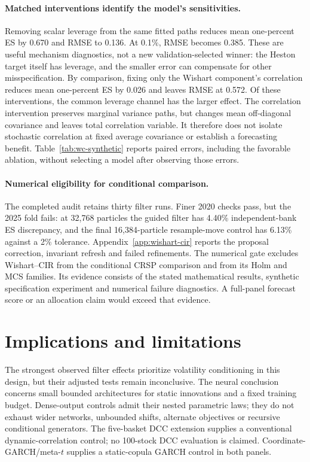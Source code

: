 \documentclass[11pt]{article}
\theoremstyle{definition}\newtheorem{definition}[theorem]{Definition}
\theoremstyle{remark}\newtheorem{remark}[theorem]{Remark}
\begin{document}
\paragraph{Matched interventions identify the model's sensitivities.}
Removing scalar leverage from the same fitted paths reduces mean one-percent ES by 0.670 and RMSE to 0.136. At 0.1\%, RMSE becomes 0.385. These are useful mechanism diagnostics, not a new validation-selected winner: the Heston target itself has leverage, and the smaller error can compensate for other misspecification. By comparison, fixing only the Wishart component's correlation reduces mean one-percent ES by 0.026 and leaves RMSE at 0.572. Of these interventions, the common leverage channel has the larger effect. The correlation intervention preserves marginal variance paths, but changes mean off-diagonal covariance and leaves total correlation variable. It therefore does not isolate stochastic correlation at fixed average covariance or establish a forecasting benefit. Table~\ref{tab:wc-synthetic} reports paired errors, including the favorable ablation, without selecting a model after observing those errors.

\paragraph{Numerical eligibility for conditional comparison.}
The completed audit retains thirty filter runs. Finer 2020 checks pass, but the 2025 fold fails: at 32,768 particles the guided filter has 4.40\% independent-bank ES discrepancy, and the final 16,384-particle resample-move control has 6.13\% against a 2\% tolerance. Appendix~\ref{app:wishart-cir} reports the proposal correction, invariant refresh and failed refinements. The numerical gate excludes Wishart--CIR from the conditional CRSP comparison and from its Holm and MCS families. Its evidence consists of the stated mathematical results, synthetic specification experiment and numerical failure diagnostics. A full-panel forecast score or an allocation claim would exceed that evidence.

\FloatBarrier

\section{Implications and limitations}\label{sec:limitations}
The strongest observed filter effects prioritize volatility conditioning in this design, but their adjusted tests remain inconclusive. The neural conclusion concerns small bounded architectures for static innovations and a fixed training budget. Dense-output controls admit their nested parametric laws; they do not exhaust wider networks, unbounded shifts, alternate objectives or recursive conditional generators. The five-basket DCC extension supplies a conventional dynamic-correlation control; no 100-stock DCC evaluation is claimed. Coordinate-GARCH/meta-$t$ supplies a static-copula GARCH control in both panels.
\end{document}
